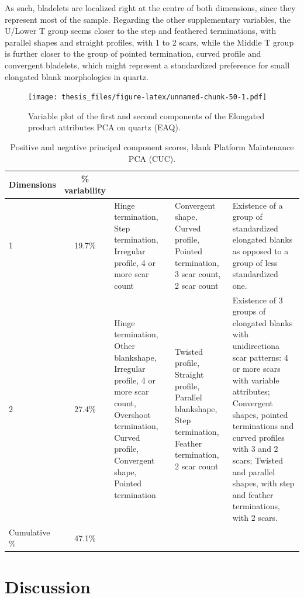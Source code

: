\documentclass[12pt,twoside]{reedthesis}
\begin{document}
As such, bladelets are localized right at the centre of both dimensions, since they represent most of the sample. Regarding the other supplementary variables, the U/Lower T group seems closer to the step and feathered terminations, with parallel shapes and straight profiles, with 1 to 2 scars, while the Middle T group is further closer to the group of pointed termination, curved profile and convergent bladelets, which might represent a standardized preference for small elongated blank morphologies in quartz.
\begin{figure}
\centering
\texttt{[image: thesis\_files/figure-latex/unnamed-chunk-50-1.pdf]}
\caption{\label{fig:unnamed-chunk-50}Variable plot of the first and second components of the Elongated product attributes PCA on quartz (EAQ).}
\end{figure}
\begin{table}

\caption{\label{tab:unnamed-chunk-51}Positive and negative principal component scores, blank Platform Maintenance PCA (CUC).}
\centering
\begin{tabular}[t]{lc>{\raggedright\arraybackslash}p{3cm}>{\raggedright\arraybackslash}p{3cm}>{\raggedright\arraybackslash}p{3cm}}
\toprule
\multicolumn{1}{c}{\textbf{Dimensions}} & \multicolumn{1}{c}{\textbf{\% variability}} & \multicolumn{1}{>{\centering\arraybackslash}p{3cm}}{\textbf{+}} & \multicolumn{1}{>{\centering\arraybackslash}p{3cm}}{\textbf{-}} & \multicolumn{1}{>{\centering\arraybackslash}p{3cm}}{\textbf{Interpretation}}\\
\midrule
1 & 19.7\% & Hinge termination, Step termination, Irregular profile, 4 or more scar count & Convergent shape, Curved profile, Pointed termination, 3 scar count, 2 scar count & Existence of a group of standardized elongated blanks as opposed to a group of less standardized one.\\
2 & 27.4\% & Hinge termination, Other blankshape, Irregular profile, 4 or more scar count, Overshoot termination, Curved profile, Convergent shape, Pointed termination & Twisted profile, Straight profile, Parallel blankshape, Step termination, Feather termination, 2 scar count & Existence of 3 groups of elongated blanks with unidirectiona scar patterns: 4 or more scars with variable attributes; Convergent shapes, pointed terminations and curved profiles with 3 and 2 scars; Twisted and parallel shapes, with step and feather terminations, with 2 scars.\\
Cumulative \% & 47.1\% &  &  & \\
\bottomrule
\end{tabular}
\end{table}
\hypertarget{discussion}{%
\chapter{Discussion}\label{discussion}}
\end{document}
